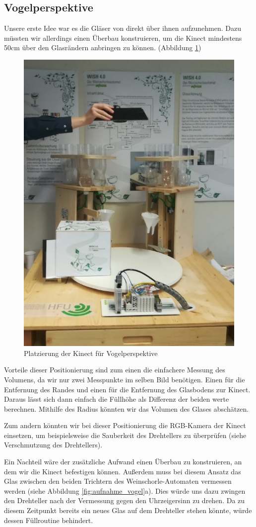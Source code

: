 \subsection{Vogelperspektive}
Unsere erste Idee war es die Gläser von direkt über ihnen aufzunehmen. Dazu müssten wir allerdings einen Überbau konstruieren, um die Kinect mindestens 50cm über den Glasrändern anbringen zu können. (Abbildung \ref{fig:position_zur_vogelperspektive})
\begin{figure}
	\centering
	\includegraphics[width=0.5\linewidth]{content/pictures/position_zur_Vogelperspektive}
	\caption{Platzierung der Kinect für Vogelperspektive}
	\label{fig:position_zur_vogelperspektive}
\end{figure}
Vorteile dieser Positionierung sind zum einen die einfachere Messung des Volumens, da wir nur zwei Messpunkte im selben Bild benötigen. Einen für die Entfernung des Randes und einen für die Entfernung des Glasbodens zur Kinect. Daraus lässt sich dann einfach die Füllhöhe als Differenz der beiden werte berechnen. Mithilfe des Radius könnten wir das Volumen des Glases abschätzen. 

Zum andern könnten wir bei dieser Positionierung die RGB-Kamera der Kinect einsetzen, um beispielsweise die Sauberkeit des Drehtellers zu überprüfen (siehe Verschmutzung des Drehtellers).

Ein Nachteil wäre der zusätzliche Aufwand einen Überbau zu konstruieren, an dem wir die Kinect befestigen können. Außerdem muss bei diesem Ansatz das Glas zwischen den beiden Trichtern des Weinschorle-Automaten vermessen werden (siehe Abbildung \ref{fig:aufnahme_vogel}a). Dies würde uns dazu zwingen den Drehteller nach der Vermessung gegen den Uhrzeigersinn zu drehen. Da zu diesem Zeitpunkt bereits ein neues Glas auf dem Drehteller stehen könnte, würde dessen Füllroutine behindert. 

